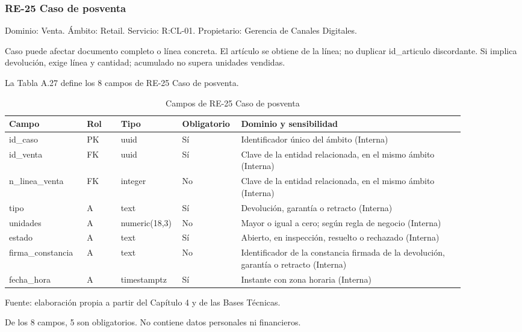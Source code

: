 \documentclass[11pt]{article}
\begin{document}
\subsubsection{RE-25 Caso de posventa}

Dominio: Venta. Ámbito: Retail. Servicio: R:CL-01. Propietario: Gerencia de Canales Digitales.

Caso puede afectar documento completo o línea concreta. El artículo se obtiene de la línea; no duplicar id\_articulo discordante. Si implica devolución, exige línea y cantidad; acumulado no supera unidades vendidas.

La Tabla A.27 define los 8 campos de RE-25 Caso de posventa.

\begin{table}[htbp]
\caption{Campos de RE-25 Caso de posventa}\label{tab:d_re25}
\centering
\begin{tabular}{@{}p{0.167\linewidth}p{0.070\linewidth}p{0.079\linewidth}p{0.097\linewidth}p{0.465\linewidth}@{}}
\toprule Campo & Rol & Tipo & Obligatorio & Dominio y sensibilidad \\
\midrule
id\_caso & PK & uuid & Sí & Identificador único del ámbito (Interna) \\
id\_venta & FK & uuid & Sí & Clave de la entidad relacionada, en el mismo ámbito (Interna) \\
n\_linea\_venta & FK & integer & No & Clave de la entidad relacionada, en el mismo ámbito (Interna) \\
tipo & A & text & Sí & Devolución, garantía o retracto (Interna) \\
unidades & A & numeric(18,3) & No & Mayor o igual a cero; según regla de negocio (Interna) \\
estado & A & text & Sí & Abierto, en inspección, resuelto o rechazado (Interna) \\
firma\_constancia & A & text & No & Identificador de la constancia firmada de la devolución, garantía o retracto (Interna) \\
fecha\_hora & A & timestamptz & Sí & Instante con zona horaria (Interna) \\
\bottomrule
\end{tabular}
\par\smallskip
{\raggedright Fuente: elaboración propia a partir del Capítulo 4 y de las Bases Técnicas.\par}
\end{table}


De los 8 campos, 5 son obligatorios. No contiene datos personales ni financieros.
\end{document}
